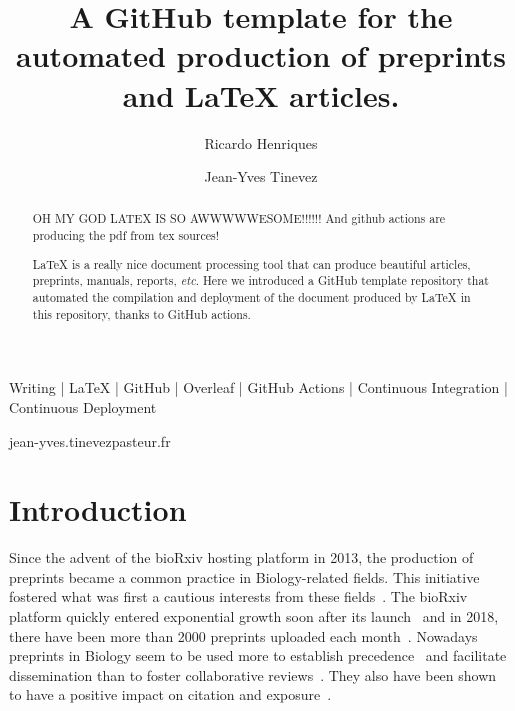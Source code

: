 
\title{A GitHub template for the automated production of preprints and LaTeX articles.}


\author[1\space\Letter]{Ricardo Henriques}
\author[2\space\Letter]{Jean-Yves Tinevez}


\maketitle

\begin{abstract} %


OH MY GOD LATEX IS SO AWWWWWESOME!!!!!! And github actions are producing the pdf from tex sources!

LaTeX is a really nice document processing tool that can produce beautiful articles, preprints, manuals, reports, \textit{etc}.
Here we introduced a GitHub template repository that automated the compilation and deployment of the document produced by LaTeX in this repository, thanks to GitHub actions.
\end{abstract}


\begin{keywords}
    Writing | LaTeX | GitHub | Overleaf | GitHub Actions | Continuous Integration | Continuous Deployment
\end{keywords}


\begin{corrauthor}
    jean-yves.tinevez\at pasteur.fr
\end{corrauthor}



\section*{Introduction}

Since the advent of the bioRxiv hosting platform in 2013, the production of preprints became a common practice in Biology-related fields.
This initiative fostered what was first a cautious interests from these fields~\cite{Callaway2012}.
The bioRxiv platform quickly entered exponential growth soon after its launch~\cite{Callaway2013} and in 2018, there have been more than 2000 preprints uploaded each month~\cite{Abdill2019}.
Nowadays preprints in Biology seem to be used more to establish precedence~\cite{Vale2016} and facilitate dissemination than to foster collaborative reviews~\cite{Anderson2020}.
They also have been shown to have a positive impact on citation and exposure~\cite{Abdill2019, Fraser2019}.

